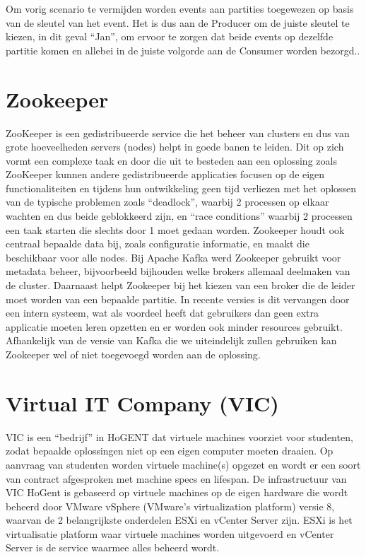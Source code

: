 Om vorig scenario te vermijden worden events aan partities toegewezen op basis van de sleutel van het event. Het is dus aan de Producer om de juiste sleutel te kiezen, in dit geval ``Jan'', om ervoor te zorgen dat beide events op dezelfde partitie komen en allebei in de juiste volgorde aan de Consumer worden bezorgd..
\autocite{Harbour2023}
\newline
\newline


\section{Zookeeper}
ZooKeeper is een gedistribueerde service die het beheer van clusters en dus van grote hoeveelheden servers (nodes) helpt in goede banen te leiden. Dit op zich vormt een complexe taak en door die uit te besteden aan een oplossing zoals ZooKeeper kunnen andere gedistribueerde applicaties focusen op de eigen functionaliteiten en tijdens hun ontwikkeling geen tijd verliezen met het oplossen van de typische problemen zoals ``deadlock'', waarbij 2 processen op elkaar wachten en dus beide geblokkeerd zijn, en ``race conditions'' waarbij 2 processen een taak starten die slechts door 1 moet gedaan worden.  
Zookeeper houdt ook centraal bepaalde data bij, zoals configuratie informatie, en maakt die beschikbaar voor alle nodes.\autocite{ASF2023}
\newline
\newline 
Bij Apache Kafka werd Zookeeper gebruikt voor metadata beheer, bijvoorbeeld bijhouden welke brokers allemaal deelmaken van de cluster. Daarnaast helpt Zookeeper bij het kiezen van een broker die de leider moet worden van een bepaalde partitie. In recente versies is dit vervangen door een intern systeem, wat als voordeel heeft dat gebruikers dan geen extra applicatie moeten leren opzetten en er worden ook minder resources gebruikt.
\autocite{Conduktor2023}
\newline
\newline
Afhankelijk van de versie van Kafka die we uiteindelijk zullen gebruiken kan Zookeeper wel of niet toegevoegd worden aan de oplossing.
\newline
\newline

\section{Virtual IT Company (VIC)}
VIC is een ``bedrijf'' in HoGENT dat virtuele machines voorziet voor studenten, zodat bepaalde oplossingen niet op een eigen computer moeten draaien. Op aanvraag van studenten worden virtuele machine(s) opgezet en wordt er een soort van contract afgesproken met machine specs en lifespan.
\newline
\newline
De infrastructuur van VIC HoGent is gebaseerd op virtuele machines op de eigen hardware die wordt beheerd door VMware vSphere (VMware's virtualization platform) versie 8, waarvan de 2 belangrijkste onderdelen ESXi en vCenter Server zijn. ESXi is het virtualisatie platform waar virtuele machines worden uitgevoerd en vCenter Server is de service waarmee alles beheerd wordt.


